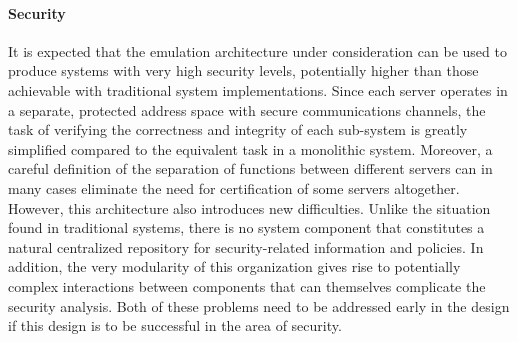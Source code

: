 \paragraph{Security}
It is expected that the emulation architecture under consideration can
be used to produce systems with very high security levels, potentially
higher than those achievable with traditional system implementations.
Since each server operates in a separate, protected address space with
secure communications channels, the task of verifying the correctness
and integrity of each sub-system is greatly simplified compared to the
equivalent task in a monolithic system. Moreover, a careful definition
of the separation of functions between different servers can in many
cases eliminate the need for certification of some servers altogether.
However, this architecture also introduces new difficulties. Unlike
the situation found in traditional systems, there is no system
component that constitutes a natural centralized repository for
security-related information and policies. In addition, the very
modularity of this organization gives rise to potentially complex
interactions between components that can themselves complicate the
security analysis. Both of these problems need to be addressed early
in the design if this design is to be successful in the area of
security.

